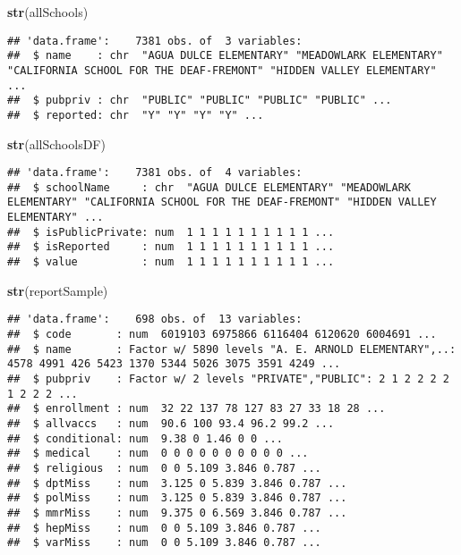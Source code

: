 \documentclass[]{article}
\newenvironment{Shaded}{\begin{snugshade}}{\end{snugshade}}
\newcommand{\KeywordTok}[1]{\textcolor[rgb]{0.13,0.29,0.53}{\textbf{#1}}}
\newcommand{\NormalTok}[1]{#1}
\begin{document}
\begin{Shaded}
\begin{Highlighting}[]
\KeywordTok{str}\NormalTok{(allSchools)}
\end{Highlighting}
\end{Shaded}

\begin{verbatim}
## 'data.frame':    7381 obs. of  3 variables:
##  $ name    : chr  "AGUA DULCE ELEMENTARY" "MEADOWLARK ELEMENTARY" "CALIFORNIA SCHOOL FOR THE DEAF-FREMONT" "HIDDEN VALLEY ELEMENTARY" ...
##  $ pubpriv : chr  "PUBLIC" "PUBLIC" "PUBLIC" "PUBLIC" ...
##  $ reported: chr  "Y" "Y" "Y" "Y" ...
\end{verbatim}

\begin{Shaded}
\begin{Highlighting}[]
\KeywordTok{str}\NormalTok{(allSchoolsDF)}
\end{Highlighting}
\end{Shaded}

\begin{verbatim}
## 'data.frame':    7381 obs. of  4 variables:
##  $ schoolName     : chr  "AGUA DULCE ELEMENTARY" "MEADOWLARK ELEMENTARY" "CALIFORNIA SCHOOL FOR THE DEAF-FREMONT" "HIDDEN VALLEY ELEMENTARY" ...
##  $ isPublicPrivate: num  1 1 1 1 1 1 1 1 1 1 ...
##  $ isReported     : num  1 1 1 1 1 1 1 1 1 1 ...
##  $ value          : num  1 1 1 1 1 1 1 1 1 1 ...
\end{verbatim}

\begin{Shaded}
\begin{Highlighting}[]
\KeywordTok{str}\NormalTok{(reportSample)}
\end{Highlighting}
\end{Shaded}

\begin{verbatim}
## 'data.frame':    698 obs. of  13 variables:
##  $ code       : num  6019103 6975866 6116404 6120620 6004691 ...
##  $ name       : Factor w/ 5890 levels "A. E. ARNOLD ELEMENTARY",..: 4578 4991 426 5423 1370 5344 5026 3075 3591 4249 ...
##  $ pubpriv    : Factor w/ 2 levels "PRIVATE","PUBLIC": 2 1 2 2 2 2 1 2 2 2 ...
##  $ enrollment : num  32 22 137 78 127 83 27 33 18 28 ...
##  $ allvaccs   : num  90.6 100 93.4 96.2 99.2 ...
##  $ conditional: num  9.38 0 1.46 0 0 ...
##  $ medical    : num  0 0 0 0 0 0 0 0 0 0 ...
##  $ religious  : num  0 0 5.109 3.846 0.787 ...
##  $ dptMiss    : num  3.125 0 5.839 3.846 0.787 ...
##  $ polMiss    : num  3.125 0 5.839 3.846 0.787 ...
##  $ mmrMiss    : num  9.375 0 6.569 3.846 0.787 ...
##  $ hepMiss    : num  0 0 5.109 3.846 0.787 ...
##  $ varMiss    : num  0 0 5.109 3.846 0.787 ...
\end{verbatim}
\end{document}
